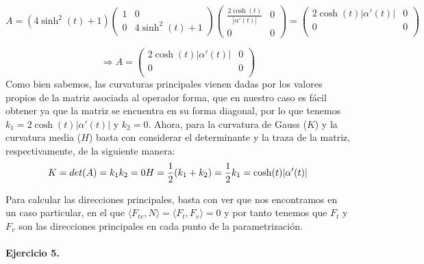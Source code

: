 \documentclass[fleqn]{article}
\begin{document}
    \begin{equation*}
        A = (4\sinh^2(t) +1)
        \begin{pmatrix}
            1 & 0\\
            0 & 4\sinh^2(t) +1
        \end{pmatrix}
        \begin{pmatrix}
            \frac{2\cosh(t)}{|\alpha'(t)|} & 0 \\
            0 & 0
        \end{pmatrix} = 
        \begin{pmatrix}
            2\cosh(t)|\alpha'(t)| & 0\\
            0 & 0 \\
        \end{pmatrix}
    \end{equation*}

    $$\Rightarrow A =
    \begin{pmatrix}
        2\cosh(t)|\alpha'(t)| & 0\\
        0 & 0 \\  
    \end{pmatrix}
    $$
    Como bien sabemos, las curvaturas principales vienen dadas por los valores propios de la matriz asociada al operador forma, que en nuestro caso es fácil obtener 
    ya que la matriz se encuentra en su forma diagonal, por lo que tenemos $k_1 = 2\cosh(t)|\alpha'(t)| $ y $k_2 = 0$. Ahora, para la curvatura de Gauss ($K$) y la curvatura
    media ($H$) basta con considerar el determinante y la traza de la matriz, respectivamente, de la siguiente manera:
    \begin{equation*}
        K = det(A) = k_1 k_2 = 0 \\
        H = \frac{1}{2}(k_1 + k_2) = \frac{1}{2}k_1 = \cosh(t)|\alpha'(t)| 
    \end{equation*} 

    Para calcular las direcciones principales, basta con ver que nos encontramos en un caso particular, en el que $\langle F_{tv}, N \rangle = \langle F_{t}, F_v \rangle = 0$
    y por tanto tenemos que $F_t$ y $F_v$ son las direcciones principales en cada punto de la parametrización.\\ \\

    \textbf{Ejercicio 5. } \\
\end{document}
